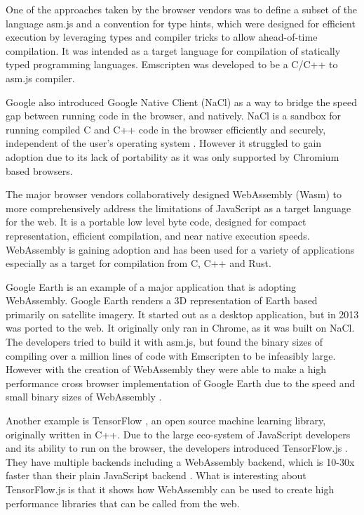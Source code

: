 \documentclass[11pt]{book}
\begin{document}

One of the approaches taken by the browser vendors was to define a subset of the language asm.js and a convention for type hints, which were designed for efficient execution by leveraging types and compiler tricks to allow ahead-of-time compilation. It was intended as a target language for compilation of statically typed programming languages. Emscripten \cite{emcc} was developed to be a C/C++ to asm.js compiler. 

Google also introduced Google Native Client (NaCl) \cite{nacl} as a way to bridge the speed gap between running code in the browser, and natively. NaCl is a sandbox for running compiled C and C++ code in the browser efficiently and securely, independent of the user’s operating system \cite{nacl}. However it struggled to gain adoption due to its lack of portability as it was only supported by Chromium based browsers. 


The major browser vendors collaboratively designed WebAssembly (Wasm) \cite{wasm_og} to more comprehensively address the limitations of JavaScript as a target language for the web. It is a portable low level byte code, designed for compact representation, efficient compilation, and near native execution speeds. Web\-Assembly is gaining adoption and has been used for a variety of applications especially as a target for compilation from C, C++ and Rust. 

Google Earth \cite{google-earth-history} is an example of a major application that is adopting WebAssembly. Google Earth renders a 3D representation of Earth based primarily on satellite imagery. It started out as a desktop application, but in 2013 was ported to the web. It originally only ran in Chrome, as it was built on NaCl. The developers tried to build it with asm.js, but found the binary sizes of compiling over a million lines of code with Emscripten to be infeasibly large. However with the creation of WebAssembly they were able to make a high performance cross browser implementation of Google Earth due to the speed and small binary sizes of WebAssembly \cite{google-earth}.

Another example is TensorFlow \cite{tensorflow}, an open source machine learning library, originally written in C++. Due to the large eco-system of JavaScript developers and its ability to run on the browser, the developers introduced TensorFlow.js \cite{tensorflowjs}. They have multiple backends including a WebAssembly backend, which is 10-30x faster than their plain JavaScript backend \cite{tf-speed}. What is interesting about TensorFlow.js is that it shows how WebAssembly can be used to create high performance libraries that can be called from the web.
\end{document}
